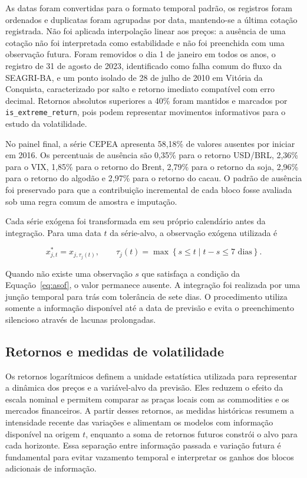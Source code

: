 \documentclass[a4paper,fleqn]{cas-sc}
\begin{document}
As datas foram convertidas para o formato temporal padrão, os registros foram ordenados e duplicatas foram agrupadas por data, mantendo-se a última cotação registrada. Não foi aplicada interpolação linear aos preços: a ausência de uma cotação não foi interpretada como estabilidade e não foi preenchida com uma observação futura. Foram removidos o dia 1 de janeiro em todos os anos, o registro de 31 de agosto de 2023, identificado como falha comum do fluxo da SEAGRI-BA, e um ponto isolado de 28 de julho de 2010 em Vitória da Conquista, caracterizado por salto e retorno imediato compatível com erro decimal. Retornos absolutos superiores a 40\% foram mantidos e marcados por \texttt{is\_extreme\_return}, pois podem representar movimentos informativos para o estudo da volatilidade.

No painel final, a série CEPEA apresenta 58,18\% de valores ausentes por iniciar em 2016. Os percentuais de ausência são 0,35\% para o retorno USD/BRL, 2,36\% para o VIX, 1,85\% para o retorno do Brent, 2,79\% para o retorno da soja, 2,96\% para o retorno do algodão e 2,97\% para o retorno do cacau. O padrão de ausência foi preservado para que a contribuição incremental de cada bloco fosse avaliada sob uma regra comum de amostra e imputação.

Cada série exógena foi transformada em seu próprio calendário antes da integração. Para uma data \(t\) da série-alvo, a observação exógena utilizada é

\begin{equation}
x_{j,t}^{*}=x_{j,\tau_j(t)},
\qquad
\tau_j(t)=\max\left\{s\leq t\;|\;t-s\leq 7\text{ dias}\right\}.
\label{eq:asof}
\end{equation}

Quando não existe uma observação \(s\) que satisfaça a condição da Equação~\ref{eq:asof}, o valor permanece ausente. A integração foi realizada por uma junção temporal para trás com tolerância de sete dias. O procedimento utiliza somente a informação disponível até a data de previsão e evita o preenchimento silencioso através de lacunas prolongadas.

\subsection{Retornos e medidas de volatilidade}
\label{subsec:returns_volatility}

Os retornos logarítmicos definem a unidade estatística utilizada para representar a dinâmica dos preços e a variável-alvo da previsão. Eles reduzem o efeito da escala nominal e permitem comparar as praças locais com as commodities e os mercados financeiros. A partir desses retornos, as medidas históricas resumem a intensidade recente das variações e alimentam os modelos com informação disponível na origem \(t\), enquanto a soma de retornos futuros constrói o alvo para cada horizonte. Essa separação entre informação passada e variação futura é fundamental para evitar vazamento temporal e interpretar os ganhos dos blocos adicionais de informação.
\end{document}
